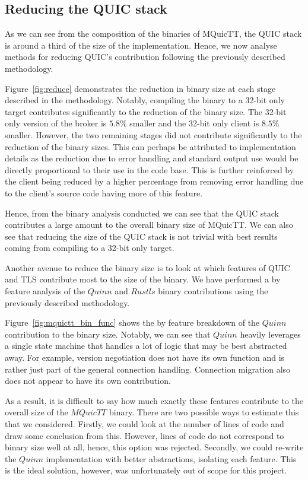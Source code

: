 \subsection{Reducing the QUIC stack}

As we can see from the composition of the binaries of MQuicTT, the QUIC stack is around a third of the size of the implementation.
Hence, we now analyse methods for reducing QUIC's contribution following the previously described methodology.

Figure~\ref{fig:reduce} demonstrates the reduction in binary size at each stage described in the methodology.
Notably, compiling the binary to a 32-bit only target contributes significantly to the reduction of the binary size.
The 32-bit only version of the broker is $5.8\%$ smaller and the 32-bit only client is $8.5\%$ smaller.
However, the two remaining stages did not contribute significantly to the reduction of the binary sizes.
This can perhaps be attributed to implementation details as the reduction due to error handling and standard output use would be directly proportional to their use in the code base.
This is further reinforced by the client being reduced by a higher percentage from removing error handling due to the client's source code having more of this feature.

Hence, from the binary analysis conducted we can see that the QUIC stack contributes a large amount to the overall binary size of MQuicTT.
We can also see that reducing the size of the QUIC stack is not trivial with best results coming from compiling to a 32-bit only target.

Another avenue to reduce the binary size is to look at which features of QUIC and TLS contribute most to the size of the binary.
We have performed a by feature analysis of the $Quinn$ and $Rustls$ binary contributions using the previously described methodology.

Figure~\ref{fig:mquictt_bin_func} shows the by feature breakdown of the $Quinn$ contribution to the binary size.
Notably, we can see that $Quinn$ heavily leverages a single state machine that handles a lot of logic that may be best abstracted away.
For example, version negotiation does not have its own function and is rather just part of the general connection handling.
Connection migration also does not appear to have its own contribution.

As a result, it is difficult to say how much exactly these features contribute to the overall size of the $MQuicTT$ binary.
There are two possible ways to estimate this that we considered.
Firstly, we could look at the number of lines of code and draw some conclusion from this.
However, lines of code do not correspond to binary size well at all, hence, this option was rejected.
Secondly, we could re-write the $Quinn$ implementation with better abstractions, isolating each feature.
This is the ideal solution, however, was unfortunately out of scope for this project.

